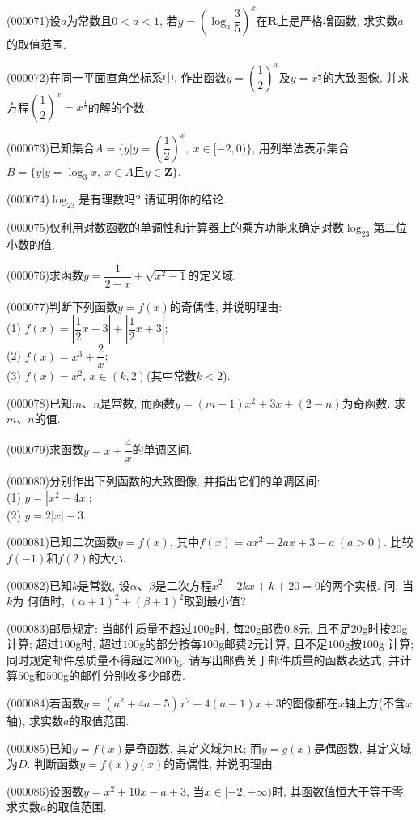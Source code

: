 \item (000071)设$a$为常数且$0<a<1$, 若$y=(\log_a \dfrac 35)^x$在$\mathbf{R}$上是严格增函数, 求实数$a$的取值范围.
\item (000072)在同一平面直角坐标系中, 作出函数$y=(\dfrac 12)^x$及$y=x^{\frac 12}$的大致图像, 并求方程$(\dfrac 12)^x=x^{\frac 12}$的解的个数.
\item (000073)已知集合$A=\{y|y=(\dfrac 12)^x,\  x\in [-2, 0)\}$, 用列举法表示集合$B=\{y|y=\log_3x,\  x\in A\text{且}y\in \mathbf{Z}\}$.
\item (000074)$\log_23$是有理数吗? 请证明你的结论.
\item (000075)仅利用对数函数的单调性和计算器上的乘方功能来确定对数$\log_23$第二位小数的值.
\item (000076)求函数$y=\dfrac1{2-x}+\sqrt{x^2-1}$的定义域.
\item (000077)判断下列函数$y=f(x)$的奇偶性, 并说明理由:\\
(1) $f(x)=|\dfrac 12 x-3|+|\dfrac 12 x+3|$;\\
(2) $f(x)=x^3+\dfrac 2x$;\\
(3) $f(x)=x^2$, $x\in (k, 2)$(其中常数$k<2$).
\item (000078)已知$m$、$n$是常数, 而函数$y=(m-1)x^2+3x+(2-n)$为奇函数. 求$m$、$n$的值.
\item (000079)求函数$y=x+\dfrac 4x$的单调区间.
\item (000080)分别作出下列函数的大致图像, 并指出它们的单调区间:\\
(1) $y=|x^2-4x|$;\\
(2) $y=2|x|-3$.
\item (000081)已知二次函数$y=f(x)$, 其中$f(x)=ax^2-2ax+3-a \ (a>0)$. 比较$f(-1)$和$f(2)$的大小.
\item (000082)已知$k$是常数, 设$\alpha$、$\beta$是二次方程$x^2-2kx+k+20=0$的两个实根. 问: 当$k$为
何值时, $(\alpha+1)^2+(\beta+1)^2$取到最小值?
\item (000083)邮局规定: 当邮件质量不超过$100$g时, 每$20$g邮费$0.8$元, 且不足$20$g时按$20$g计算; 超过$100$g时, 超过$100$g的部分按每$100$g邮费$2$元计算, 且不足$100$g按$100$g
计算; 同时规定邮件总质量不得超过$2000$g. 请写出邮费关于邮件质量的函数表达式, 并计算$50$g和$500$g的邮件分别收多少邮费.
\item (000084)若函数$y=(a^2+4a-5)x^2-4(a-1)x+3$的图像都在$x$轴上方(不含$x$轴), 求实数$a$的取值范围.
\item (000085)已知$y=f(x)$是奇函数, 其定义域为$\mathbf{R}$; 而$y=g(x)$是偶函数, 其定义域为$D$. 判断函数$y=f(x)g(x)$的奇偶性, 并说明理由.
\item (000086)设函数$y=x^2+10x-a+3$, 当$x\in [-2, +\infty)$时, 其函数值恒大于等于零. 求实数$a$的取值范围.
